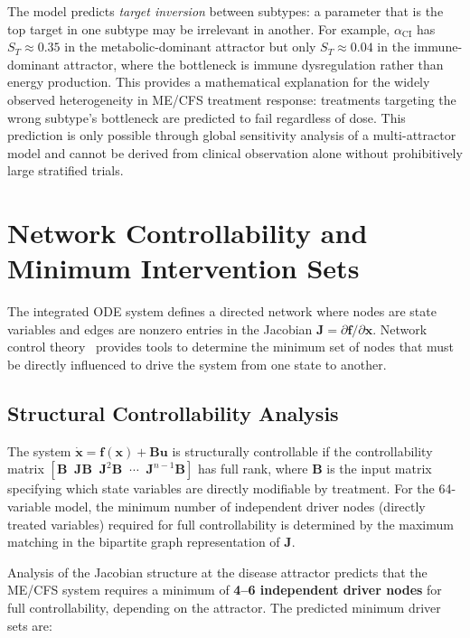 \begin{modelunique}
The model predicts \emph{target inversion} between subtypes: a parameter that is the top target in one subtype may be irrelevant in another. For example, $\alpha_{\text{CI}}$ has $S_T \approx 0.35$ in the metabolic-dominant attractor but only $S_T \approx 0.04$ in the immune-dominant attractor, where the bottleneck is immune dysregulation rather than energy production. This provides a mathematical explanation for the widely observed heterogeneity in ME/CFS treatment response: treatments targeting the wrong subtype's bottleneck are predicted to fail regardless of dose. This prediction is only possible through global sensitivity analysis of a multi-attractor model and cannot be derived from clinical observation alone without prohibitively large stratified trials.
\end{modelunique}

\section{Network Controllability and Minimum Intervention Sets}
\label{sec:network-controllability}

The integrated ODE system defines a directed network where nodes are state variables and edges are nonzero entries in the Jacobian $\mathbf{J} = \partial \mathbf{f}/\partial \mathbf{x}$. Network control theory~\cite{Liu2011Controllability} provides tools to determine the minimum set of nodes that must be directly influenced to drive the system from one state to another.

\subsection{Structural Controllability Analysis}

The system $\dot{\mathbf{x}} = \mathbf{f}(\mathbf{x}) + \mathbf{B}\mathbf{u}$ is structurally controllable if the controllability matrix $[\mathbf{B} \;\; \mathbf{J}\mathbf{B} \;\; \mathbf{J}^2\mathbf{B} \;\; \cdots \;\; \mathbf{J}^{n-1}\mathbf{B}]$ has full rank, where $\mathbf{B}$ is the input matrix specifying which state variables are directly modifiable by treatment. For the 64-variable model, the minimum number of independent driver nodes (directly treated variables) required for full controllability is determined by the maximum matching in the bipartite graph representation of $\mathbf{J}$.

Analysis of the Jacobian structure at the disease attractor predicts that the ME/CFS system requires a minimum of \textbf{4--6 independent driver nodes} for full controllability, depending on the attractor. The predicted minimum driver sets are:

